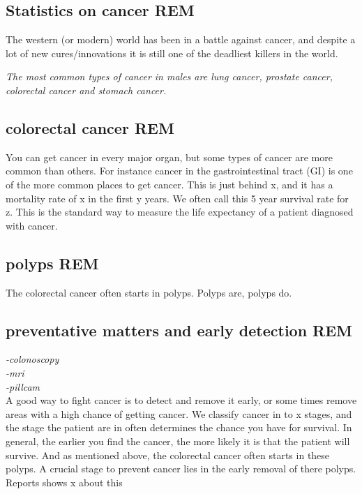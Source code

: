 \documentclass[a4paper,english]{ifimaster}
\begin{document}
	
	
	\vspace{10px}
	
	\subsection{Statistics on cancer REM}
	The western (or modern) world has been in a battle against cancer, and despite a 
	lot of new cures/innovations it is still one of the deadliest killers in the world. 

	
	\textit{The most common types of cancer in males are lung cancer, prostate cancer, colorectal cancer and stomach cancer.\cite{stewart2014world}}
	
	
	\vspace{10px}
	\subsection{colorectal cancer REM}
	You can get cancer in every major organ, but some types of cancer are more common than others.
	For instance cancer in the gastrointestinal tract (GI) is one of the more common places 
	to get cancer. This is just behind x, and it has a mortality rate of x in the first y years. %
	We often call this 5 year survival rate for z. This is the standard way to measure the life expectancy of a patient diagnosed with cancer. 
	
	
	\vspace{10px}
	\subsection{polyps REM}
	The colorectal cancer often starts in polyps. 
	Polyps are, polyps do.\\
	
	\vspace{10px}
	\subsection{preventative matters and early detection REM}
	\textit{-colonoscopy\\ 
		-mri\\
		-pillcam\\}
	A good way to fight cancer is to detect and remove it early, or some times remove areas with a high chance of getting cancer.
	We classify cancer in to x stages, and the stage the patient are in often determines the chance you have for survival. 
	In general, the earlier you find the cancer, the more likely it is that the patient will survive. 
	And as mentioned above, the colorectal cancer often starts in these polyps. A crucial stage to prevent cancer lies in the 
	early removal of there polyps.
	Reports shows x about this %
	
\end{document}
